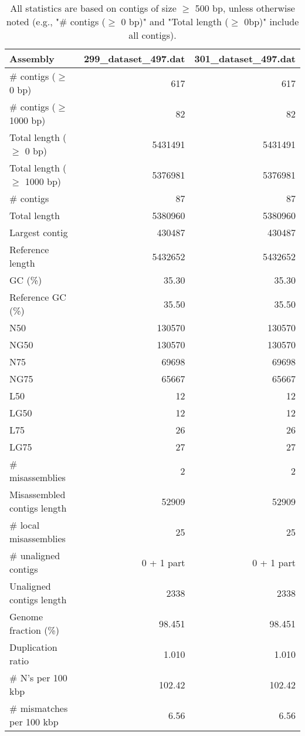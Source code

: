 \documentclass[12pt,a4paper]{article}
\begin{document}
\begin{table}[ht]
\begin{center}
\caption{All statistics are based on contigs of size $\geq$ 500 bp, unless otherwise noted (e.g., "\# contigs ($\geq$ 0 bp)" and "Total length ($\geq$ 0bp)" include all contigs).}
\begin{tabular}{|l*{2}{|r}|}
\hline
Assembly & 299\_dataset\_497.dat & 301\_dataset\_497.dat \\ \hline
\# contigs ($\geq$ 0 bp) & 617 & 617 \\ \hline
\# contigs ($\geq$ 1000 bp) & 82 & 82 \\ \hline
Total length ($\geq$ 0 bp) & 5431491 & 5431491 \\ \hline
Total length ($\geq$ 1000 bp) & 5376981 & 5376981 \\ \hline
\# contigs & 87 & 87 \\ \hline
Total length & 5380960 & 5380960 \\ \hline
Largest contig & 430487 & 430487 \\ \hline
Reference length & 5432652 & 5432652 \\ \hline
GC (\%) & 35.30 & 35.30 \\ \hline
Reference GC (\%) & 35.50 & 35.50 \\ \hline
N50 & 130570 & 130570 \\ \hline
NG50 & 130570 & 130570 \\ \hline
N75 & 69698 & 69698 \\ \hline
NG75 & 65667 & 65667 \\ \hline
L50 & 12 & 12 \\ \hline
LG50 & 12 & 12 \\ \hline
L75 & 26 & 26 \\ \hline
LG75 & 27 & 27 \\ \hline
\# misassemblies & 2 & 2 \\ \hline
Misassembled contigs length & 52909 & 52909 \\ \hline
\# local misassemblies & 25 & 25 \\ \hline
\# unaligned contigs & 0 + 1 part & 0 + 1 part \\ \hline
Unaligned contigs length & 2338 & 2338 \\ \hline
Genome fraction (\%) & 98.451 & 98.451 \\ \hline
Duplication ratio & 1.010 & 1.010 \\ \hline
\# N's per 100 kbp & 102.42 & 102.42 \\ \hline
\# mismatches per 100 kbp & 6.56 & 6.56 \\ \hline

\end{tabular}
\end{center}
\end{table}
\end{document}
